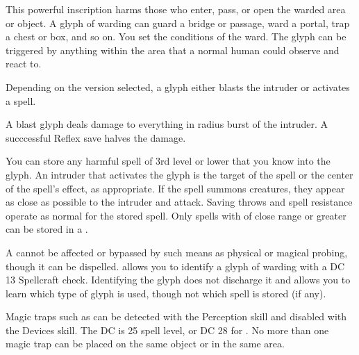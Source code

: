 \spellschool{Abjuration (Warding) [Trap}
\begin{spelleffect}
\par This powerful inscription harms those who enter, pass, or open the warded area or object. A glyph of warding can guard a bridge or passage, ward a portal, trap a chest or box, and so on. You set the conditions of the ward. The glyph can be triggered by anything within the area that a normal human could observe and react to.
\par Depending on the version selected, a glyph either blasts the intruder or activates a spell.
\par {} A blast glyph deals damage to everything in \areasmall radius burst of the intruder. A succcessful Reflex save halves the damage.
\par {} You can store any harmful spell of 3rd level or lower that you know into the glyph. An intruder that activates the glyph is the target of the spell or the center of the spell's effect, as appropriate. If the spell summons creatures, they appear as close as possible to the intruder and attack. Saving throws and spell resistance operate as normal for the stored spell. Only spells with of close range or greater can be stored in a .
\end{spelleffect}
\begin{spellnotes}
\par A  cannot be affected or bypassed by such means as physical or magical probing, though it can be dispelled.  allows you to identify a glyph of warding with a DC 13 Spellcraft check. Identifying the glyph does not discharge it and allows you to learn which type of glyph is used, though not which spell is stored (if any).
\par Magic traps such as  can be detected with the Perception skill and disabled with the Devices skill. The DC is 25 \add spell level, or DC 28 for . No more than one magic trap can be placed on the same object or in the same area.
\end{spellnotes}

